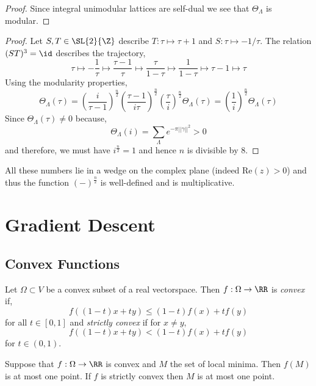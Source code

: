 \documentclass[12pt]{article}
\begin{document}
\begin{proof}
Since integral unimodular lattices are self-dual we see that $\Theta_{\Lambda}$ is modular. 
\end{proof}

\begin{proof}
Let $S, T \in \SL{2}{\Z}$ describe $T : \tau \mapsto \tau + 1$ and $S : \tau \mapsto -1/\tau$. The relation $(ST)^3 = \id$ describes the trajectory,
\[ \tau \mapsto - \frac{1}{\tau} \mapsto \frac{\tau - 1}{\tau} \mapsto \frac{\tau}{1 - \tau} \mapsto \frac{1}{1 - \tau} \mapsto \tau - 1 \mapsto \tau \]
Using the modularity properties,
\[ \Theta_{\Lambda}(\tau) = \left( \frac{i}{\tau - 1} \right)^{\frac{n}{2}} \left( \frac{\tau - 1}{i \tau} \right)^{\frac{n}{2}} \left( \frac{\tau}{i} \right)^{\frac{n}{2}} \Theta_{\Lambda}(\tau) = \left( \frac{1}{i} \right)^{\frac{n}{2}} \Theta_{\Lambda}(\tau) \]
Since $\Theta_{\Lambda}(\tau) \neq 0$ because,
\[ \Theta_{\Lambda}(i) = \sum_{\Lambda} e^{- \pi || \gamma ||^2} > 0 \]
and therefore, we must have $i^{\frac{n}{2}} = 1$ and hence $n$ is divisible by $8$. 
\end{proof}

\begin{rmk}
All these numbers lie in a wedge on the complex plane (indeed $\mathrm{Re}(z) > 0$) and thus the function $(-)^{\frac{n}{2}}$ is well-defined and is multiplicative. 
\end{rmk}

\section{Gradient Descent}

\subsection{Convex Functions}

\begin{defn}
Let $\Omega \subset V$ be a convex subset of a real vectorspace. Then $f : \Omega \to \RR$ is \textit{convex} if,
\[ f((1-t) x + t y) \le (1-t) f(x) + t f(y) \]
for all $t \in [0,1]$ and \textit{strictly convex} if for $x \neq y$,
\[ f((1-t) x + ty) < (1-t) f(x) + t f(y) \]
for $t \in (0, 1)$. 
\end{defn}

\begin{prop}
Suppose that $f : \Omega \to \RR$ is convex and $M$ the set of local minima. Then $f(M)$ is at most one point. If $f$ is strictly convex then $M$ is at most one point.
\end{prop}
\end{document}
